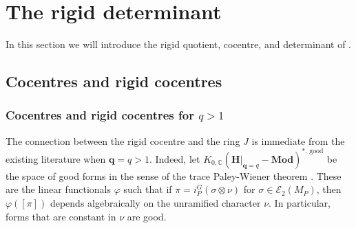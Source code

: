 \documentclass[10pt]{article}
\newcommand{\Mod}{\mathbf{Mod}}
\newcommand{\HH}{\mathbf{H}}
\newcommand{\Ee}{\mathcal{E}}
\newcommand{\C}{\mathbb{C}}
\newcommand{\bq}{\mathbf{q}}
\theoremstyle{definition}
\theoremstyle{remark}
\newcommand{\Gd}{G^\vee}
\newcommand{\Zur}{Z_{G^\vee}(u)^{\mathrm{red}}}
\begin{document}
\section{The rigid determinant}
\label{section rigid det}
In this section we will introduce the rigid quotient, cocentre, and determinant of \cite{CH}.

\subsection{Cocentres and rigid cocentres}

\subsubsection{Cocentres and rigid cocentres for $q>1$}
\label{subsubsection cocentres and rigid cocentres for q>1}
The connection between the rigid cocentre and the ring $J$ is immediate from the existing literature
when $\bq=q>1$. Indeed, let $K_{0,\C}(\HH|_{\bq=q}-\Mod)^{*,\,\mathrm{good}}$ be the space of good forms in 
the sense of the trace Paley-Wiener theorem \cite{BDeligneKazhdanTrace}. These are the linear functionals 
$\varphi$ such that if $\pi=i_P^G(\sigma\otimes\nu)$ for $\sigma\in\Ee_2(M_P)$, then $\varphi([\pi])$ depends algebraically on the unramified character $\nu$. In particular, 
forms that are constant in $\nu$ are good.	
\end{document}
